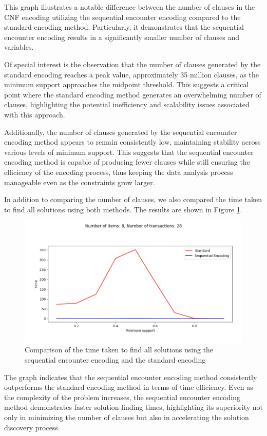 This graph illustrates a notable difference between the number of clauses in the CNF encoding
utilizing the sequential encounter encoding compared to the standard encoding method. Particularly, it demonstrates that the sequential encounter encoding results in a significantly smaller number of clauses and variables.

Of special interest is the observation that the number of clauses generated by the standard encoding reaches a peak value,
approximately 35 million clauses, as the minimum support approaches the midpoint threshold.
This suggests a critical point where the standard encoding method generates an overwhelming number of clauses,
highlighting the potential inefficiency and scalability issues associated with this approach.

Additionally, the number of clauses generated by the sequential encounter encoding method appears to remain consistently low,
maintaining stability across various levels of minimum support.
This suggests that the sequential encounter encoding method is capable of producing fewer clauses while still ensuring the efficiency of the encoding process,
thus keeping the data analysis process manageable even as the constraints grow larger.

In addition to comparing the number of clauses, we also compared the time taken to find all solutions using both methods.
The results are shown in Figure \ref{fig:4_2}.
\begin{figure}[H]
    \centering
    \includegraphics[width=1\textwidth]{chapter4/image/n_trans_28_time.png}
    \caption{Comparison of the time taken to find all solutions using the sequential encounter encoding and the standard encoding}
    \label{fig:4_2}
\end{figure}

The graph indicates that the sequential encounter encoding method consistently outperforms the standard encoding method in terms of time efficiency.
Even as the complexity of the problem increases, the sequential encounter encoding method demonstrates faster solution-finding times,
highlighting its superiority not only in minimizing the number of clauses but also in accelerating the solution discovery process.

